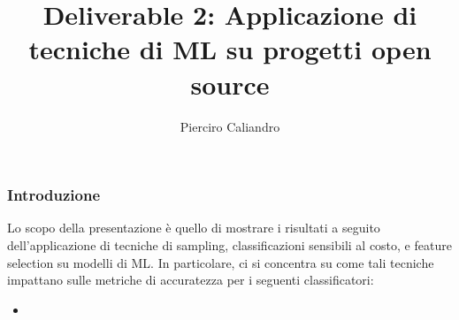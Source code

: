 \documentclass[10pt]{beamer}
\title{Deliverable 2: Applicazione di tecniche di ML su progetti open source}
\author{Pierciro Caliandro}
\institute{Università degli studi di Roma Tor Vergata}
\begin{document}
\footnotesize
\begin{frame}
\titlepage
\end{frame}

\begin{frame}
\frametitle{Introduzione}
Lo scopo della presentazione è quello di mostrare i risultati a seguito dell'applicazione di tecniche di sampling, classificazioni
sensibili al costo, e feature selection su modelli di ML. In particolare, ci si concentra su come tali tecniche impattano sulle metriche di accuratezza per i seguenti classificatori:
\begin{itemize}
\item 
\end{itemize}
\end{frame}
\end{document}

